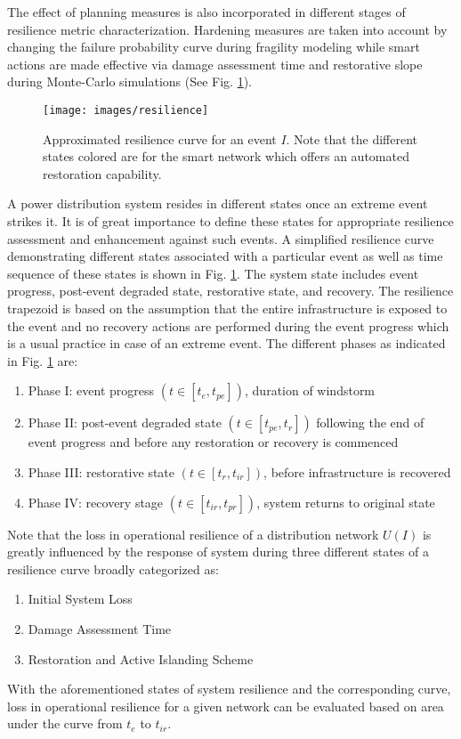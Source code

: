 \documentclass[12pt]{article}
\begin{document}
 
 The effect of planning measures is also incorporated in different stages of resilience metric characterization. Hardening measures are taken into account by changing the failure probability curve during fragility modeling while smart actions are made effective via damage assessment time and restorative slope during Monte-Carlo simulations (See Fig. \ref{fig:res}).
 
 \begin{figure}[t]
    \centering
    \texttt{[image: images/resilience]}
    \caption{\small Approximated resilience curve for an event $I$. Note that the different states colored are for the smart network which offers an automated restoration capability.}
\label{fig:res}
\end{figure}
 
 A power distribution system resides in different states once an extreme event strikes it. It is of great importance to define these states for appropriate resilience assessment and enhancement against such events. A simplified resilience curve demonstrating different states associated with a particular event as well as time sequence of these states is shown in Fig. \ref{fig:res}. The system state includes event progress, post-event degraded state, restorative state, and recovery. The resilience trapezoid is based on the assumption that the entire infrastructure is exposed to the event and no recovery actions are performed during the event progress which is a usual practice in case of an extreme event. The different phases as indicated in Fig. \ref{fig:res} are:

\begin{enumerate}
    \item Phase I: event progress $(t\in[t_e, t_{pe}])$, duration of windstorm
    \item Phase II: post-event degraded state $(t\in[t_{pe}, t_{r}])$ following the end of event progress and before any restoration or recovery is commenced
    \item Phase III: restorative state $(t\in[t_r, t_{ir}])$, before infrastructure is recovered
    \item Phase IV: recovery stage $(t\in[t_{ir}, t_{pr}])$, system returns to original state
\end{enumerate}
 Note that the loss in operational resilience of a distribution network $U(I)$ is greatly influenced by the response of system during three different states of a resilience curve broadly categorized as:
 \begin{enumerate}
    \item Initial System Loss
    \item Damage Assessment Time
    \item Restoration and Active Islanding Scheme
\end{enumerate}
 With the aforementioned states of system resilience and the corresponding curve, loss in operational resilience for a given network can be evaluated based on area under the curve from $t_e$ to $t_{ir}$.
\end{document}

